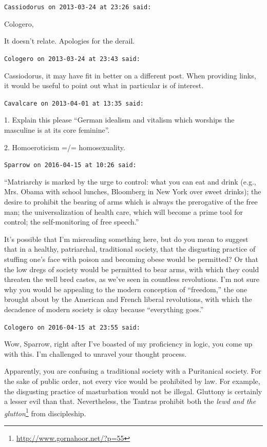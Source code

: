\begin{footnotesize}
\begin{sffamily}
\hfill

\texttt{Cassiodorus on 2013-03-24 at 23:26 said:}

Cologero,

It doesn't relate. Apologies for the derail.

\hfill

\texttt{Cologero on 2013-03-24 at 23:43 said:}

Cassiodorus, it may have fit in better on a different post. When providing links, it would be useful to point out what in particular is of interest.

\hfill

\texttt{Cavalcare on 2013-04-01 at 13:35 said:}

1. Explain this please ``German idealism and vitalism which worships the masculine is at its core feminine''.

2. Homoeroticism =/= homosexuality.

\hfill

\texttt{Sparrow on 2016-04-15 at 10:26 said:}

``Matriarchy is marked by the urge to control: what you can eat and drink (e.g., Mrs. Obama with school lunches, Bloomberg in New York over sweet drinks); the desire to prohibit the bearing of arms which is always the prerogative of the free man; the universalization of health care, which will become a prime tool for control; the self-monitoring of free speech.''

It's possible that I'm misreading something here, but do you mean to suggest that in a healthy, patriarchal, traditional society, that the disgusting practice of stuffing one's face with poison and becoming obese would be permitted? Or that the low dregs of society would be permitted to bear arms, with which they could threaten the well bred castes, as we've seen in countless revolutions. I'm not sure why you would be appealing to the modern conception of ``freedom,'' the one brought about by the American and French liberal revolutions, with which the decadence of modern society is okay because ``everything goes.''

\hfill

\texttt{Cologero on 2016-04-15 at 23:55 said:}

Wow, Sparrow, right after I've boasted of my proficiency in logic, you come up with this. I'm challenged to unravel your thought process.

Apparently, you are confusing a traditional society with a Puritanical society. For the sake of public order, not every vice would be prohibited by law. For example, the disgusting practice of masturbation would not be illegal. Gluttony is certainly a lesser evil than that. Nevertheless, the Tantras prohibit both the \textit{lewd and the glutton}\footnote{\url{http://www.gornahoor.net/?p=55}} from discipleship.


\end{sffamily}
\end{footnotesize}
